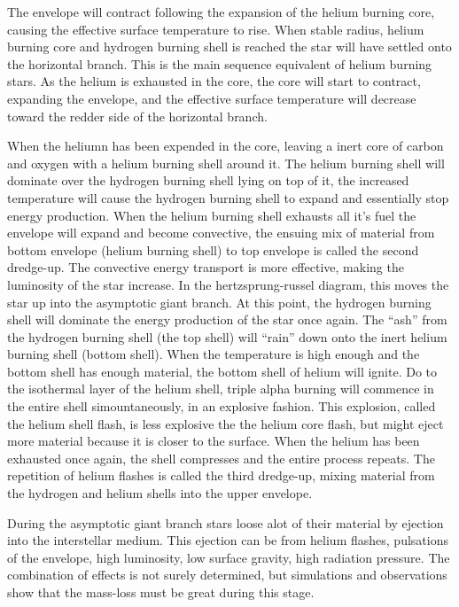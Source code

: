 The envelope will contract following the expansion of the helium burning core, causing the effective surface temperature to rise. When stable radius, helium burning core and hydrogen burning shell is reached the star will have settled onto the horizontal branch. This is the main sequence equivalent of helium burning stars. As the helium is exhausted in the core, the core will start to contract, expanding the envelope, and the effective surface temperature will decrease toward the redder side of the horizontal branch.

When the heliumn has been expended in the core, leaving a inert core of carbon and oxygen with a helium burning shell around it.
The helium burning shell will dominate over the hydrogen burning shell lying on top of it, the increased temperature will cause the hydrogen burning shell to expand and essentially stop energy production.
When the helium burning shell exhausts all it's fuel the envelope will expand and become convective, the ensuing mix of material from bottom envelope (helium burning shell) to top envelope is called the second dredge-up. The convective energy transport is more effective, making the luminosity of the star increase. In the hertzsprung-russel diagram, this moves the star up into the asymptotic giant branch.
At this point, the hydrogen burning shell will dominate the energy production of the star once again. The ``ash'' from the hydrogen burning shell (the top shell) will ``rain'' down onto the inert helium burning shell (bottom shell). When the temperature is high enough and the bottom shell has enough material, the bottom shell of helium will ignite. Do to the isothermal layer of the helium shell, triple alpha burning will commence in the entire shell simountaneously, in an explosive fashion. This explosion, called the helium shell flash, is less explosive the the helium core flash, but might eject more material because it is closer to the surface.
When the helium has been exhausted once again, the shell compresses and the entire process repeats. The repetition of helium flashes is called the third dredge-up, mixing material from the hydrogen and helium shells into the upper envelope.

During the asymptotic giant branch stars loose alot of their material by ejection into the interstellar medium. This ejection can be from helium flashes, pulsations of the envelope, high luminosity, low surface gravity, high radiation pressure. The combination of effects is not surely determined, but simulations and observations show that the mass-loss must be great during this stage.

